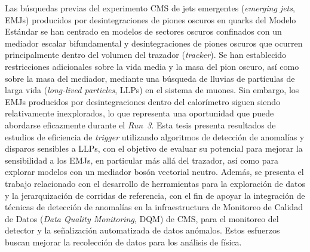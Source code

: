 \noindent
Las búsquedas previas del experimento CMS de jets emergentes (\textit{emerging jets}, EMJs) producidos por desintegraciones de piones oscuros en quarks del Modelo Estándar se han centrado en modelos de sectores oscuros confinados con un mediador escalar bifundamental y desintegraciones de piones oscuros que ocurren principalmente dentro del volumen del trazador (\textit{tracker}). Se han establecido restricciones adicionales sobre la vida media y la masa del pion oscuro, así como sobre la masa del mediador, mediante una búsqueda de lluvias de partículas de larga vida (\textit{long-lived particles}, LLPs) en el sistema de muones. Sin embargo, los EMJs producidos por desintegraciones dentro del calorímetro siguen siendo relativamente inexplorados, lo que representa una oportunidad que puede abordarse eficazmente durante el \textit{Run 3}. Esta tesis presenta resultados de estudios de eficiencia de \textit{trigger} utilizando algoritmos de detección de anomalías y disparos sensibles a LLPs, con el objetivo de evaluar su potencial para mejorar la sensibilidad a los EMJs, en particular más allá del trazador, así como para explorar modelos con un mediador bosón vectorial neutro. Además, se presenta el trabajo relacionado con el desarrollo de herramientas para la exploración de datos y la jerarquización de corridas de referencia, con el fin de apoyar la integración de técnicas de detección de anomalías en la infraestructura de Monitoreo de Calidad de Datos (\textit{Data Quality Monitoring}, DQM) de CMS, para el monitoreo del detector y la señalización automatizada de datos anómalos. Estos esfuerzos buscan mejorar la recolección de datos para los análisis de física.
